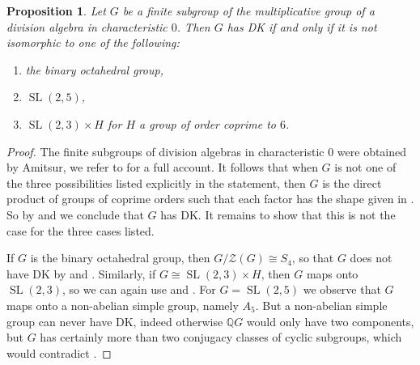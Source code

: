 \documentclass[a4paper,10pt]{amsart}
\newtheorem{proposition}[lemma]{Proposition}
\theoremstyle{definition}
\theoremstyle{remark}
\newcommand{\ZZ}{\mathcal{Z}}
\newcommand{\Q}{{\mathbb Q}}
\begin{document}
\begin{proposition}\label{prop:DKForAmitsur}
Let $G$ be a finite subgroup of the multiplicative group of a division algebra in characteristic $0$. Then $G$ has DK if and only if it is not isomorphic to one of the following:
\begin{enumerate}
\item the binary octahedral group,
\item $\operatorname{SL}(2,5)$,
\item $\operatorname{SL}(2,3) \times H$ for $H$ a group of order coprime to $6$.
\end{enumerate}  
\end{proposition}
\begin{proof}
The finite subgroups of division algebras in characteristic $0$ were obtained by Amitsur, we refer to \cite[Theorem 2.1.4, 2.1.5]{ShirvaniWehrfritz} for a full account. It follows that when $G$ is not one of the three possibilities listed explicitly in the statement, then $G$ is the direct product of groups of coprime orders such that each factor has the shape given in . So by  and  we conclude that $G$ has DK. It remains to show that this is not the case for the three cases listed.

If $G$ is the binary octahedral group, then $G/\ZZ(G) \cong S_4$, so that $G$ does not have DK by  and . Similarly, if $G \cong \operatorname{SL}(2,3) \times H$, then $G$ maps onto $\operatorname{SL}(2,3)$, so we can again use  and . For $G = \operatorname{SL}(2,5)$ we observe that $G$ maps onto a non-abelian simple group, namely $A_5$. But a non-abelian simple group can never have DK, indeed otherwise $\Q G$ would only have two components, but $G$ has certainly more than two conjugacy classes of cyclic subgroups, which would contradict \cite[Corollary 7.1.12]{GRG1}.
\end{proof}
\end{document}
